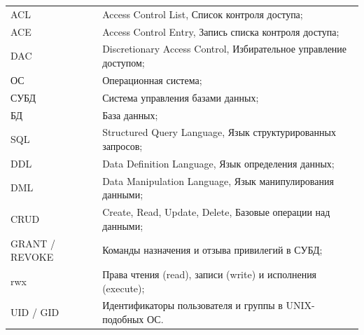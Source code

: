 \label{sec:reduction}

\noindent
\begin{tabular}{@{}p{2.4cm}@{\ \mdash\ }p{12.2cm}@{}}
ACL & Access Control List, Список контроля доступа;\\
ACE & Access Control Entry, Запись списка контроля доступа;\\
DAC & Discretionary Access Control, Избирательное управление доступом;\\
ОС & Операционная система;\\
СУБД & Система управления базами данных;\\
БД & База данных;\\
SQL & Structured Query Language, Язык структурированных запросов;\\
DDL & Data Definition Language, Язык определения данных;\\
DML & Data Manipulation Language, Язык манипулирования данными;\\
CRUD & Create, Read, Update, Delete, Базовые операции над данными;\\
GRANT / REVOKE & Команды назначения и отзыва привилегий в СУБД;\\
rwx & Права чтения (read), записи (write) и исполнения (execute);\\
UID / GID & Идентификаторы пользователя и группы в UNIX-подобных ОС.
\end{tabular}
